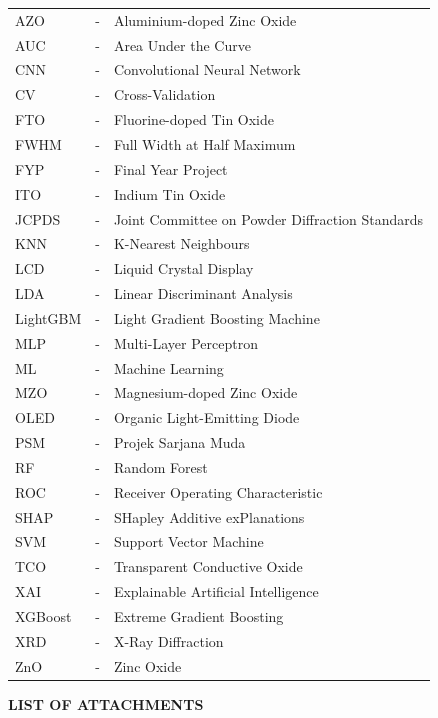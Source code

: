 \documentclass[12pt, oneside]{article} %
\begin{document}
\noindent
\begin{tabular}{>{\raggedright\arraybackslash}p{2.5cm} >{\centering\arraybackslash}m{0.5cm} >{\raggedright\arraybackslash}p{11.0cm}}
AZO   & - & Aluminium-doped Zinc Oxide \\
AUC   & - & Area Under the Curve \\
CNN   & - & Convolutional Neural Network \\
CV    & - & Cross-Validation \\
FTO   & - & Fluorine-doped Tin Oxide \\
FWHM  & - & Full Width at Half Maximum \\
FYP   & - & Final Year Project \\
ITO   & - & Indium Tin Oxide \\
JCPDS & - & Joint Committee on Powder Diffraction Standards \\
KNN   & - & K-Nearest Neighbours \\
LCD   & - & Liquid Crystal Display \\
LDA   & - & Linear Discriminant Analysis \\
LightGBM & - & Light Gradient Boosting Machine \\
MLP   & - & Multi-Layer Perceptron \\
ML    & - & Machine Learning \\
MZO   & - & Magnesium-doped Zinc Oxide \\
OLED  & - & Organic Light-Emitting Diode \\
PSM   & - & Projek Sarjana Muda \\
RF    & - & Random Forest \\
ROC   & - & Receiver Operating Characteristic \\
SHAP  & - & SHapley Additive exPlanations \\
SVM   & - & Support Vector Machine \\
TCO   & - & Transparent Conductive Oxide \\
XAI   & - & Explainable Artificial Intelligence \\
XGBoost & - & Extreme Gradient Boosting \\
XRD   & - & X-Ray Diffraction \\
ZnO   & - & Zinc Oxide \\
\end{tabular}



\vfill \null
\newpage



\vfill \null
{}
{}
\begin{center}
\textbf{LIST OF ATTACHMENTS}
\end{center}
\vspace{2cm}
\end{document}
